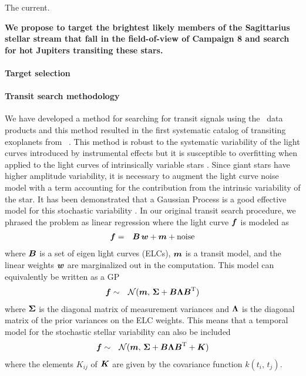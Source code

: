 \documentclass[letterpaper,12pt,preprint]{hack_aastex}
\begin{document}
The current.

{\bf We propose to target the brightest likely members of the Sagittarius
stellar stream that fall in the field-of-view of Campaign 8 and search for hot
Jupiters transiting these stars.}

\paragraph{Target selection}

\paragraph{Transit search methodology}

We have developed a method for searching for transit signals using the \KT\
data products and this method resulted in the first systematic catalog of
transiting exoplanets from \KT\ \citep{Foreman-Mackey:2015}.
This method is robust to the systematic variability of the light curves
introduced by instrumental effects but it is susceptible to overfitting when
applied to the light curves of intrinsically variable stars
\citep{Montet:2015}.
Since giant stars have higher amplitude variability, it is necessary to
augment the light curve noise model with a term accounting for the
contribution from the intrinsic variability of the star.
It has been demonstrated that a Gaussian Process
\citep[GP;][]{Rasmussen:2006, Ambikasaran:2014} is a good effective
model for this stochastic variability \citep{Barclay:2015}.
In our original transit search procedure, we phrased the problem as linear
regression \citep{Foreman-Mackey:2015} where the light curve ${{\boldsymbol{f}}}$ is
modeled as
\begin{eqnarray}
{\ensuremath{{\boldsymbol{f}}}} &=& {{\boldsymbol{B}}}\,{{\boldsymbol{w}}} + {{\boldsymbol{m}}} + \mathrm{noise}
\end{eqnarray}
where ${{\boldsymbol{B}}}$ is a set of eigen light curves (ELCs), ${{\boldsymbol{m}}}$ is a
transit model, and the linear weights ${{\boldsymbol{w}}}$ are marginalized out in the
computation.
This model can equivalently be written as a GP \citep{Rasmussen:2006}
\begin{eqnarray}
{\ensuremath{{\boldsymbol{f}}}} &\sim& \mathcal{N} ({{\boldsymbol{m}}},\,
{{\boldsymbol{\Sigma}}} + {{\boldsymbol{B}}}{{\boldsymbol{\Lambda}}}{{\boldsymbol{B}}}^\mathrm{T})
\end{eqnarray}
where ${{\boldsymbol{\Sigma}}}$ is the diagonal matrix of measurement variances and
${{\boldsymbol{\Lambda}}}$ is the diagonal matrix of the prior variances on the ELC
weights.
This means that a temporal model for the stochastic stellar variability can
also be included
\begin{eqnarray}
{\ensuremath{{\boldsymbol{f}}}} &\sim& \mathcal{N} ({{\boldsymbol{m}}},\,
{{\boldsymbol{\Sigma}}} + {{\boldsymbol{B}}}{{\boldsymbol{\Lambda}}}{{\boldsymbol{B}}}^\mathrm{T} + {{\boldsymbol{K}}})
\end{eqnarray}
where the elements $K_{ij}$ of ${{\boldsymbol{K}}}$ are given by the covariance function
$k(t_i,\,t_j)$.
\end{document}
